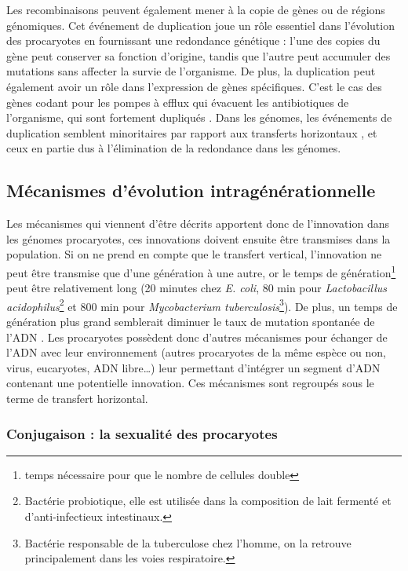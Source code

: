 Les recombinaisons peuvent également mener à la copie de gènes ou de régions génomiques. Cet événement de duplication joue un rôle essentiel dans l'évolution des procaryotes en fournissant une redondance génétique : l'une des copies du gène peut conserver sa fonction d'origine, tandis que l'autre peut accumuler des mutations sans affecter la survie de l'organisme. De plus, la duplication peut également avoir un rôle dans l'expression de gènes spécifiques. C'est le cas des gènes codant pour les pompes à efflux qui évacuent les antibiotiques de l'organisme, qui sont fortement dupliqués \cite{maddamsetti_duplicated_2024}. Dans les génomes, les événements de duplication semblent minoritaires par rapport aux transferts horizontaux \cite{tria_gene_2021}, et ceux en partie dus à l'élimination de la redondance dans les génomes. 

\subsection{Mécanismes d'évolution intragénérationnelle}
\label{sec:evo_hz}

Les mécanismes qui viennent d'être décrits apportent donc de l'innovation dans les génomes procaryotes, ces innovations doivent ensuite être transmises dans la population. Si on ne prend en compte que le transfert vertical, l'innovation ne peut être transmise que d'une génération à une autre, or le temps de génération\footnote{temps nécessaire pour que le nombre de cellules double} peut être relativement long (20 minutes chez \textit{E. coli}, 80 min pour \textit{Lactobacillus acidophilus}\footnote{Bactérie probiotique, elle est utilisée dans la composition de lait fermenté et d'anti-infectieux intestinaux.} et 800 min pour \textit{Mycobacterium tuberculosis}\footnote{Bactérie responsable de la tuberculose chez l'homme, on la retrouve principalement dans les voies respiratoire.}). De plus, un temps de génération plus grand semblerait diminuer le taux de mutation spontanée de l'ADN \cite{weller_generation-time_2015}. Les procaryotes possèdent donc d'autres mécanismes pour échanger de l'ADN avec leur environnement (autres procaryotes de la même espèce ou non, virus, eucaryotes, ADN libre\dots) leur permettant d'intégrer un segment d'ADN contenant une potentielle innovation. Ces mécanismes sont regroupés sous le terme de transfert horizontal. 

\subsubsection{Conjugaison : la sexualité des procaryotes}


